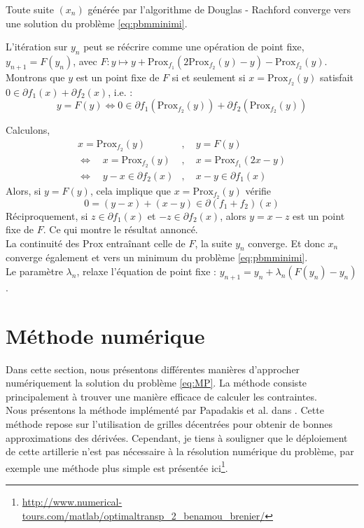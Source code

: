 \documentclass[a4paper,12pt]{article}
\newcommand{\prox}{\text{Prox}}
\begin{document}
\begin{propriete}
Toute suite $(x_n)$ générée par l'algorithme de Douglas - Rachford converge vers une solution du problème \ref{eq:pbmminimi}.
\end{propriete}

\begin{preuve}
L'itération sur $y_n$ peut se réécrire comme une opération de point fixe, $y_{n+1}=F(y_n)$, avec $F:y\mapsto y+\prox_{ f_1}(2\prox_{f_2}(y)-y)-\prox_{f_2}(y)$.\\
Montrons que $y$ est un point fixe de $F$ si et seulement si $x=\prox_{f_2}(y)$ satisfait $0\in\partial f_1(x)+\partial f_2(x)$, i.e. :
$$
y=F(y) \Longleftrightarrow 0\in\partial f_1(\prox_{f_2}(y))+\partial f_2(\prox_{f_2}(y))
$$ 

Calculons, 
\begin{align*}
x=\prox_{f_2}(y) &,\quad y = F(y) \\
\Longleftrightarrow\quad x=\prox_{ f_2}(y) &,\quad x = \prox_{f_1}(2x-y) \\
\Longleftrightarrow\quad y-x\in\partial f_2(x)   &, \quad x-y\in\partial f_1(x)
\end{align*}
Alors, si $y=F(y)$, cela implique que $x=\prox_{f_2}(y)$ vérifie 
$$
0=(y-x)+(x-y)\in \partial(f_1+f_2)(x)
$$
Réciproquement, si $z\in\partial f_1(x)$ et $-z\in\partial f_2(x)$, alors $y=x-z$ est un point fixe de $F$. Ce qui montre le résultat annoncé.\\
La continuité des $\prox$ entraînant celle de $F$, la suite $y_n$ converge. Et donc $x_n$ converge également et vers un minimum du problème \eqref{eq:pbmminimi}.\\

Le paramètre $\lambda_n$, relaxe l'équation de point fixe : $y_{n+1}=y_n + \lambda_n(F(y_n)-y_n)$. 
\end{preuve}






\newpage

\section{Méthode numérique}
\label{sec:numerique}
Dans cette section, nous présentons différentes manières d'approcher numériquement la solution du problème \eqref{eq:MP}. La méthode consiste principalement à trouver une manière efficace de calculer les contraintes. \\

Nous présentons la méthode implémenté par Papadakis et al. dans \cite{papadakis}. Cette méthode repose sur l'utilisation de grilles décentrées pour obtenir de bonnes approximations des dérivées. Cependant, je tiens à souligner que le déploiement de cette artillerie n'est pas nécessaire à la résolution numérique du problème, par exemple une méthode plus simple est présentée ici\footnote{\url{http://www.numerical-tours.com/matlab/optimaltransp\_2\_benamou\_brenier/}}.\\
\end{document}
